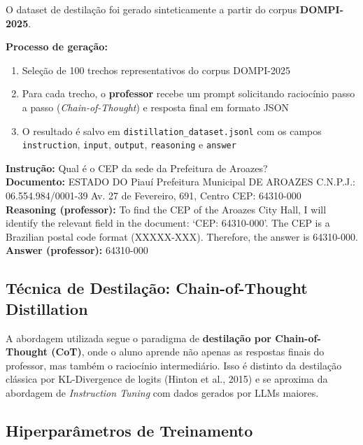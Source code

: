 \documentclass[12pt, a4paper]{article}
\begin{document}
O dataset de destilação foi gerado sinteticamente a partir do corpus
\textbf{DOMPI-2025}.

\textbf{Processo de geração:}
\begin{enumerate}
  \item Seleção de 100 trechos representativos do corpus DOMPI-2025
  \item Para cada trecho, o \textbf{professor} recebe um prompt solicitando raciocínio
        passo a passo (\textit{Chain-of-Thought}) e resposta final em formato JSON
  \item O resultado é salvo em \texttt{distillation\_dataset.jsonl} com os campos
        \texttt{instruction}, \texttt{input}, \texttt{output}, \texttt{reasoning} e \texttt{answer}
\end{enumerate}

\begin{exemplobox}
\textbf{Instrução:} Qual é o CEP da sede da Prefeitura de Aroazes?\\[0.3em]
\textbf{Documento:} ESTADO DO Piauí Prefeitura Municipal DE AROAZES C.N.P.J.:
06.554.984/0001-39 Av. 27 de Fevereiro, 691, Centro CEP: 64310-000\\[0.3em]
\textbf{Reasoning (professor):} To find the CEP of the Aroazes City Hall, I will
identify the relevant field in the document: `CEP: 64310-000'. The CEP is a
Brazilian postal code format (XXXXX-XXX). Therefore, the answer is 64310-000.\\[0.3em]
\textbf{Answer (professor):} 64310-000
\end{exemplobox}

\subsection{Técnica de Destilação: Chain-of-Thought Distillation}

A abordagem utilizada segue o paradigma de \textbf{destilação por Chain-of-Thought
(CoT)}, onde o aluno aprende não apenas as respostas finais do professor, mas também
o raciocínio intermediário. Isso é distinto da destilação clássica por KL-Divergence
de logits (Hinton et al., 2015) e se aproxima da abordagem de \textit{Instruction
Tuning} com dados gerados por LLMs maiores.

\subsection{Hiperparâmetros de Treinamento}
\end{document}
